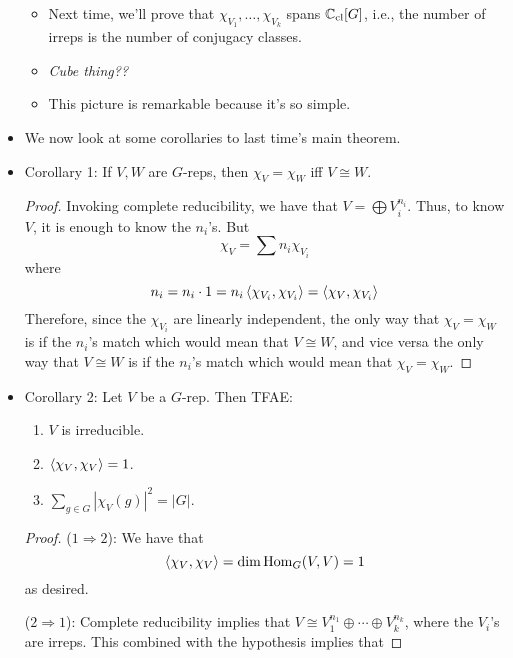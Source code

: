\documentclass[../notes.tex]{subfiles}
\begin{document}
\begin{itemize}
\begin{itemize}
\begin{itemize}
        \end{itemize}
        \item Next time, we'll prove that $\chi_{V_1},\dots,\chi_{V_k}$ spans $\mathbb{C}_\text{cl}[G]$, i.e., the number of irreps is the number of conjugacy classes.
        \item \emph{Cube thing??}
        \item This picture is remarkable because it's so simple.
    \end{itemize}
    \item We now look at some corollaries to last time's main theorem.
    \item Corollary 1: If $V,W$ are $G$-reps, then $\chi_V=\chi_W$ iff $V\cong W$.
    \begin{proof}
        Invoking complete reducibility, we have that $V=\bigoplus V_i^{n_i}$. Thus, to know $V$, it is enough to know the $n_i$'s. But
        \begin{equation*}
            \chi_V = \sum n_i\chi_{V_i}
        \end{equation*}
        where
        \begin{equation*}
            n_i = n_i\cdot 1 = n_i\left\langle{\chi_{V_i},\chi_{V_i}}\right\rangle = \left\langle{\chi_V,\chi_{V_i}}\right\rangle
        \end{equation*}
        Therefore, since the $\chi_{V_i}$ are linearly independent, the only way that $\chi_V=\chi_W$ is if the $n_i$'s match which would mean that $V\cong W$, and vice versa the only way that $V\cong W$ is if the $n_i$'s match which would mean that $\chi_V=\chi_W$.
    \end{proof}
    \item Corollary 2: Let $V$ be a $G$-rep. Then TFAE:
    \begin{enumerate}
        \item $V$ is irreducible.
        \item $\left\langle{\chi_V,\chi_V}\right\rangle=1$.
        \item $\sum_{g\in G}|\chi_V(g)|^2=|G|$.
    \end{enumerate}
    \begin{proof}
        ($1\Rightarrow 2$): We have that
        \begin{equation*}
            \left\langle{\chi_V,\chi_V}\right\rangle = \dim\operatorname{Hom}_G(V,V) = 1
        \end{equation*}
        as desired.\par
        ($2\Rightarrow 1$): Complete reducibility implies that $V\cong V_1^{n_1}\oplus\cdots\oplus V_k^{n_k}$, where the $V_i$'s are irreps. This combined with the hypothesis implies that

\end{proof}
\end{itemize}
\end{document}
